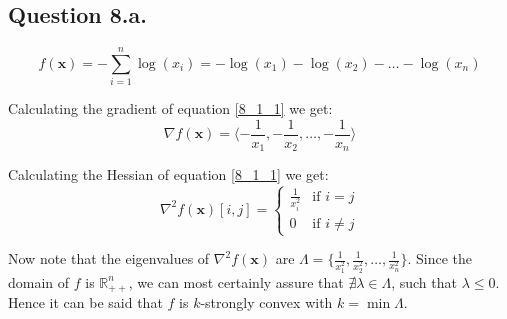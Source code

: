 \documentclass{article}
\begin{document}
\subsection*{Question 8.a.}
\begin{flushleft}
\begin{equation}
\label{8_1_1}
f(\mathbf{x}) = \displaystyle - \sum_{i=1}^{n} \log(x_{i}) = - \log(x_{1}) - \log(x_{2}) - \ldots - \log(x_{n})
\end{equation}

Calculating the gradient of equation \ref{8_1_1} we get:
\begin{equation}
\nabla f(\mathbf{x}) = \langle -\frac{1}{x_{1}}, -\frac{1}{x_{2}}, \ldots, -\frac{1}{x_{n}} \rangle
\end{equation}

Calculating the Hessian of equation \ref{8_1_1} we get:
\begin{equation}
\displaystyle \nabla^{2} f(\mathbf{x}) [i,j] = \begin{cases}
\frac{1}{x^{2}_{i}} & \text{if } i = j \\
0 & \text{if } i \neq j
\end{cases}
\end{equation}

Now note that the eigenvalues of \(\nabla^{2} f(\mathbf{x})\) are \(\Lambda = \lbrace\frac{1}{x^{2}_{1}}, \frac{1}{x^{2}_{2}}, \ldots, \frac{1}{x^{2}_{n}}\rbrace\). Since the domain of \(f\) is \(\mathbb{R}^{n}_{++}\), we can most certainly assure that \(\nexists \lambda \in \Lambda\), such that \(\lambda \leq 0\). Hence it can be said that \(f\) is \(k\)-strongly convex with \(k = \min \Lambda\).
\end{flushleft}
\end{document}
